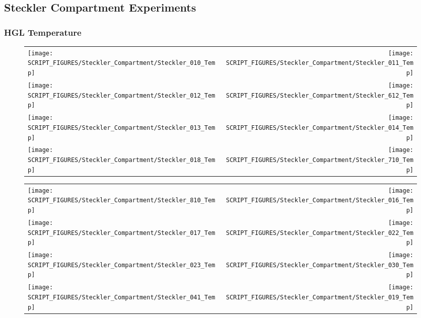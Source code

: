 \clearpage

\subsection{Steckler Compartment Experiments}

\subsubsection{HGL Temperature}

\begin{figure}[p]
\begin{tabular*}{\textwidth}{l@{\extracolsep{\fill}}r}
\texttt{[image: SCRIPT\_FIGURES/Steckler\_Compartment/Steckler\_010\_Temp]} &
\texttt{[image: SCRIPT\_FIGURES/Steckler\_Compartment/Steckler\_011\_Temp]} \\
\texttt{[image: SCRIPT\_FIGURES/Steckler\_Compartment/Steckler\_012\_Temp]} &
\texttt{[image: SCRIPT\_FIGURES/Steckler\_Compartment/Steckler\_612\_Temp]} \\
\texttt{[image: SCRIPT\_FIGURES/Steckler\_Compartment/Steckler\_013\_Temp]} &
\texttt{[image: SCRIPT\_FIGURES/Steckler\_Compartment/Steckler\_014\_Temp]} \\
\texttt{[image: SCRIPT\_FIGURES/Steckler\_Compartment/Steckler\_018\_Temp]} &
\texttt{[image: SCRIPT\_FIGURES/Steckler\_Compartment/Steckler\_710\_Temp]}
\end{tabular*}
\end{figure}

\begin{figure}[p]
\begin{tabular*}{\textwidth}{l@{\extracolsep{\fill}}r}
\texttt{[image: SCRIPT\_FIGURES/Steckler\_Compartment/Steckler\_810\_Temp]} &
\texttt{[image: SCRIPT\_FIGURES/Steckler\_Compartment/Steckler\_016\_Temp]} \\
\texttt{[image: SCRIPT\_FIGURES/Steckler\_Compartment/Steckler\_017\_Temp]} &
\texttt{[image: SCRIPT\_FIGURES/Steckler\_Compartment/Steckler\_022\_Temp]} \\
\texttt{[image: SCRIPT\_FIGURES/Steckler\_Compartment/Steckler\_023\_Temp]} &
\texttt{[image: SCRIPT\_FIGURES/Steckler\_Compartment/Steckler\_030\_Temp]} \\
\texttt{[image: SCRIPT\_FIGURES/Steckler\_Compartment/Steckler\_041\_Temp]} &
\texttt{[image: SCRIPT\_FIGURES/Steckler\_Compartment/Steckler\_019\_Temp]}
\end{tabular*}
\end{figure}

